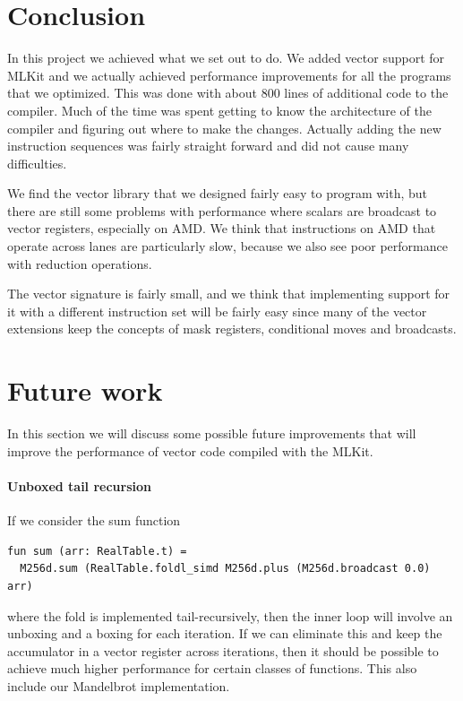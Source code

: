 \documentclass{article}
\begin{document}
\section{Conclusion}

In this project we achieved what we set out to do. We added vector support for MLKit and we actually achieved performance improvements for all the programs that we optimized. This was done with about 800 lines of additional code to the compiler. Much of the time was spent getting to know the architecture of the compiler and figuring out where to make the changes. Actually adding the new instruction sequences was fairly straight forward and did not cause many difficulties.

We find the vector library that we designed fairly easy to program with, but there are still some problems with performance where scalars are broadcast to vector registers, especially on AMD. We think that instructions on AMD that operate across lanes are particularly slow, because we also see poor performance with reduction operations.

The vector signature is fairly small, and we think that implementing support for it with a different instruction set will be fairly easy since many of the vector extensions keep the concepts of mask registers, conditional moves and broadcasts.

\section{Future work}

In this section we will discuss some possible future improvements that will improve the performance of vector code compiled with the MLKit.

\paragraph{Unboxed tail recursion}

If we consider the sum function
\begin{verbatim}
fun sum (arr: RealTable.t) =
  M256d.sum (RealTable.foldl_simd M256d.plus (M256d.broadcast 0.0) arr)
\end{verbatim}
where the fold is implemented tail-recursively, then the inner loop will involve an unboxing and a boxing for each iteration. If we can eliminate this and keep the accumulator in a vector register across iterations, then it should be possible to achieve much higher performance for certain classes of functions. This also include our Mandelbrot implementation.
\end{document}
